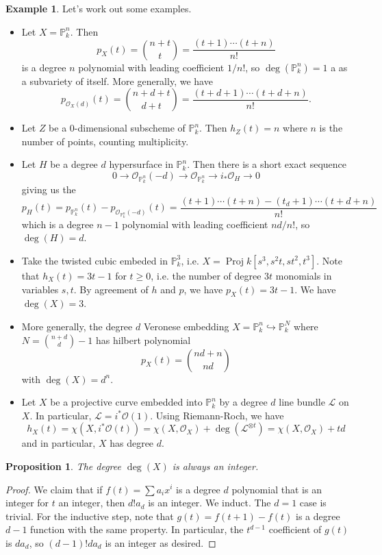 \documentclass[10pt]{article}
\newtheorem{prop}[thm]{Proposition}
\theoremstyle{definition}
\newtheorem{exmp}[thm]{Example}
\DeclareMathOperator{\Proj}{Proj}
\newcommand{\PP}{\mathbb{P}}
\newcommand{\OO}{\mathcal{O}}
\newcommand{\LL}{\mathcal{L}}
\begin{document}
\begin{exmp}
Let's work out some examples.
\begin{itemize}
\item Let $X = \PP^n_k$.  Then 
$$p_X(t) = \binom{n+t}{t} = \frac{(t+1)\cdots(t+n)}{n!}$$
is a degree $n$ polynomial with leading coefficient $1/n!$, so $\deg(\PP^n_k) = 1$ a as a subvariety of itself.  More generally, we have
$$p_{\OO_X(d)}(t) = \binom{n+d+t}{d+t} = \frac{(t+d+1)\cdots(t+d+n)}{n!}.$$
\item Let $Z$ be a 0-dimensional subscheme of $\PP^n_k$.  Then $h_Z(t) = n$ where $n$ is the number of points, counting multiplicity.
\item Let $H$ be a degree $d$ hypersurface in $\PP^n_k$.  Then there is a short exact sequence
$$0 \rightarrow \OO_{\PP^n_k}(-d) \rightarrow \OO_{\PP^n_k} \rightarrow i_* \OO_H \rightarrow 0$$
giving us the
$$p_H(t) = p_{\PP^n_k}(t) - p_{\OO_{\PP^n_k}(-d)}(t) = \frac{(t+1)\cdots(t+n) - (t_d+1)\cdots(t+d+n)}{n!}$$
which is a degree $n-1$ polynomial with leading coefficient $nd/n!$, so $\deg(H) = d$.
\item Take the twisted cubic embeded in $\PP^3_k$, i.e. $X = \Proj k[s^3, s^2t, st^2, t^3]$.  Note that $h_X(t) = 3t - 1$ for $t \geq 0$, i.e. the number of degree $3t$ monomials in variables $s, t$.  By agreement of $h$ and $p$, we have $p_X(t) = 3t - 1$.  We have $\deg(X) = 3$.
\item More generally, the degree $d$ Veronese embedding $X = \PP^n_k \hookrightarrow \PP_k^N$ where $N = \binom{n+d}{d} - 1$ has hilbert polynomial 
$$p_X(t) = \binom{nd+n}{nd}$$
with $\deg(X) = d^n$.
\item Let $X$ be a projective curve embedded into $\PP^n_k$ by a degree $d$ line bundle $\LL$ on $X$.  In particular, $\LL = i^* \OO(1)$.  Using Riemann-Roch, we have
$$h_X(t) = \chi(X, i^* \OO(t)) = \chi(X, \OO_X) + \deg(\LL^{\otimes t}) = \chi(X, \OO_X) + td$$
and in particular, $X$ has degree $d$.
\end{itemize}
\end{exmp}

\begin{prop}
The degree $\deg(X)$ is always an integer.
\end{prop}
\begin{proof}
We claim that if $f(t) = \sum a_i x^i$ is a degree $d$ polynomial that is an integer for $t$ an integer, then $d! a_d$ is an integer.  We induct.  The $d = 1$ case is trivial.  For the inductive step, note that $g(t) = f(t+1)-f(t)$ is a degree $d-1$ function with the same property.  In particular, the $t^{d-1}$ coefficient of $g(t)$ is $d a_d$, so $(d-1)! d a_d$ is an integer as desired.
\end{proof}
\end{document}
